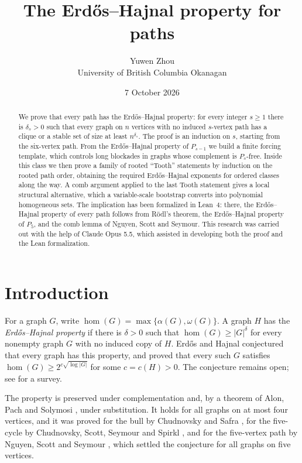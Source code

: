 \documentclass[11pt,a4paper]{article}
\theoremstyle{definition}
\theoremstyle{remark}
\numberwithin{equation}{section}
\begin{document}
\title{The Erd\H{o}s--Hajnal property for paths}
\author{Yuwen Zhou\\[2pt]\small University of British Columbia Okanagan}
\date{7 October 2026}
\maketitle
\begin{abstract}
We prove that every path has the Erd\H{o}s--Hajnal property: for every integer \(s\ge1\) there is \(\delta_s>0\) such that every graph on \(n\) vertices with no induced \(s\)-vertex path has a clique or a stable set of size at least \(n^{\delta_s}\). The proof is an induction on \(s\), starting from the six-vertex path. From the Erd\H{o}s--Hajnal property of \(P_{s-1}\) we build a finite forcing template, which controls long blockades in graphs whose complement is \(P_s\)-free. Inside this class we then prove a family of rooted ``Tooth'' statements by induction on the rooted path order, obtaining the required Erd\H{o}s--Hajnal exponents for ordered classes along the way. A comb argument applied to the last Tooth statement gives a local structural alternative, which a variable-scale bootstrap converts into polynomial homogeneous sets. The implication has been formalized in Lean~4: there, the Erd\H{o}s--Hajnal property of every path follows from R\"odl's theorem, the Erd\H{o}s--Hajnal property of \(P_5\), and the comb lemma of Nguyen, Scott and Seymour. This research was carried out with the help of Claude Opus 5.5, which assisted in developing both the proof and the Lean formalization.
\end{abstract}
\tableofcontents
\clearpage
\section{Introduction}\label{sec:intro}
For a graph \(G\), write \(\hom(G)=\max\{\alpha(G),\omega(G)\}\). A graph \(H\) has the \emph{Erd\H{o}s--Hajnal property} if there is \(\delta>0\) such that \(\hom(G)\ge |G|^\delta\) for every nonempty graph \(G\) with no induced copy of \(H\). Erd\H{o}s and Hajnal \cite{eh} conjectured that every graph has this property, and proved that every such \(G\) satisfies \(\hom(G)\ge 2^{c\sqrt{\log |G|}}\) for some \(c=c(H)>0\). The conjecture remains open; see \cite{chudnovsky} for a survey.

The property is preserved under complementation and, by a theorem of Alon, Pach and Solymosi \cite{aps}, under substitution. It holds for all graphs on at most four vertices, and it was proved for the bull by Chudnovsky and Safra \cite{cs}, for the five-cycle by Chudnovsky, Scott, Seymour and Spirkl \cite{csss}, and for the five-vertex path by Nguyen, Scott and Seymour \cite{nss7}, which settled the conjecture for all graphs on five vertices.
\end{document}
